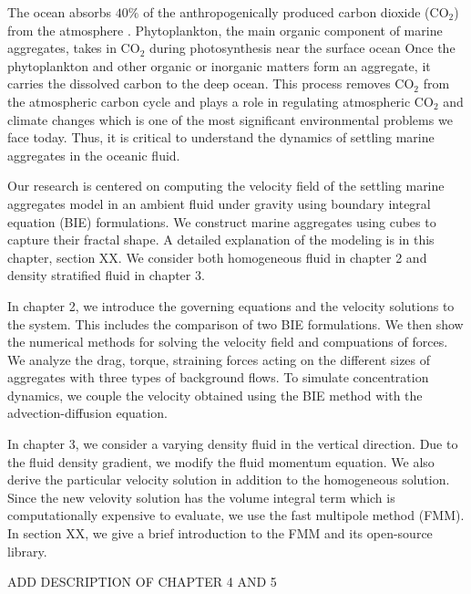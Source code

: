 The ocean absorbs $40 \%$ of the anthropogenically produced carbon dioxide (CO$_2$) from the atmosphere \cite{omand_sinking_2020}. 
 Phytoplankton, the main organic component of marine aggregates, takes in CO$_2$ during photosynthesis near the surface ocean
Once the phytoplankton and other organic or inorganic matters form an aggregate, it carries the dissolved carbon to the deep ocean. This process removes CO$_2$ from the atmospheric carbon cycle \cite{burd_particle_2009} and plays a role in regulating atmospheric CO$_2$ and climate changes which is one of the most significant environmental problems we face today. 
 Thus, it is critical to understand the dynamics of settling marine aggregates in the oceanic fluid.
\par
Our research is centered on computing the velocity field of the settling marine aggregates model in an ambient fluid under gravity using boundary integral equation (BIE) formulations. We construct marine aggregates using cubes to capture their fractal shape. A detailed explanation of the modeling is in this chapter, section XX. We consider both homogeneous fluid in chapter 2 and density stratified fluid in chapter 3. 
\par
In chapter 2, we introduce the governing equations and the velocity solutions to the system. This includes the comparison of two BIE formulations. We then show the numerical methods for solving the velocity field and compuations of forces. We analyze the drag, torque, straining forces acting on the different sizes of aggregates with three types of background flows.
 To simulate concentration dynamics, we couple the velocity obtained using the BIE method with the advection-diffusion equation.
\par
In chapter 3, we consider a varying density fluid in the vertical direction. Due to the fluid density gradient, we modify the fluid momentum equation. We also derive the particular velocity solution in addition to the homogeneous solution. Since the new velovity solution has the volume integral term which is computationally expensive to evaluate, we use the fast multipole method (FMM). In section XX, we give a brief introduction to the FMM and its open-source library. 
\par
{\color{blue} ADD DESCRIPTION OF CHAPTER 4 AND 5}

